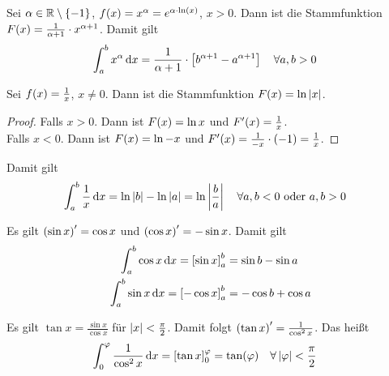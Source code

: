 \begin{beispiel}
    Sei $\alpha\in\mathbb{R}\setminus\left\{-1\right\}$, $f\of{x} = x^{\alpha} = e^{\alpha\cdot\ln\of{x}}$, $x > 0$. Dann ist die Stammfunktion $F\of{x} = \frac{1}{\alpha + 1}\cdot x^{\alpha + 1}$. Damit gilt
    \begin{align*}
        \int_{a}^{b} x^{\alpha} \mathop{}\!\mathrm{d} x &= \frac{1}{\alpha +1}\cdot\left[b^{\alpha+1} - a^{\alpha+1}\right]\quad\forall a,b > 0
    \end{align*}
\end{beispiel}

\begin{beispiel}
    Sei $f\of{x} = \frac{1}{x}$, $x\neq 0$. Dann ist die Stammfunktion $F\of{x} = \ln \abs{x}$.
    \begin{proof}
        Falls $x > 0$. Dann ist $F\of{x} = \ln x$ und $F'\of{x} = \frac{1}{x}$.\\
        Falls $x < 0$. Dann ist $F\of{x} = \ln -x$ und $F'\of{x} = \frac{1}{-x}\cdot\pair{-1} = \frac{1}{x}$.
    \end{proof}
    \noindent Damit gilt
    \begin{align*}
        \int_{a}^{b} \frac{1}{x} \mathop{}\!\mathrm{d} x &= \ln\left\lvert b\right\rvert - \ln\left\lvert a\right\rvert = \ln\left\lvert\frac{b}{a}\right\rvert\quad\forall a,b < 0 \text{ oder } a,b > 0
    \end{align*}
\end{beispiel}

\begin{beispiel}
    Es gilt $\left(\sin x\right)' = \cos x$ und $\left(\cos x\right)' = -\sin x$. Damit gilt
    \begin{align*}
        \int_{a}^{b} \cos x \mathop{}\!\mathrm{d} x = \left[\sin x\right]_{a}^b &= \sin b - \sin a\\
        \int_{a}^{b} \sin x \mathop{}\!\mathrm{d} x = \left[-\cos x\right]_a^b &= -\cos b + \cos a\\
    \end{align*}
\end{beispiel}

\begin{beispiel}
    Es gilt $\tan x = \frac{\sin x}{\cos x}$ für $\left\lvert x\right\rvert < \frac{\pi}{2}$. Damit folgt $\left(\tan x\right)' = \frac{1}{\cos^2 x}$. Das heißt
    \begin{align*}
        \int_{0}^{\varphi} \frac{1}{\cos^2 x} \dif x &= \interv{\tan x}_0^{\varphi} = \tan\of{\varphi}\quad\forall\abs{\varphi} < \frac{\pi}{2}
    \end{align*}
\end{beispiel}

